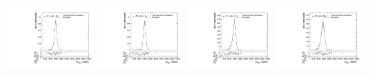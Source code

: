 \begin{figure}[htpb]
  \centering
  \includegraphics[width=0.2\textwidth]{fig/2Dfit/templateVsReco_VBFRadToWW2000_r0_MVV_mu_HP_nobb_LDy_linear.pdf}
  \includegraphics[width=0.2\textwidth]{fig/2Dfit/templateVsReco_VBFRadToWW2000_r0_MVV_mu_LP_nobb_LDy_linear.pdf}
  \includegraphics[width=0.2\textwidth]{fig/2Dfit/templateVsReco_VBFRadToWW2000_r0_MVV_mu_HP_nobb_HDy_linear.pdf}
  \includegraphics[width=0.2\textwidth]{fig/2Dfit/templateVsReco_VBFRadToWW2000_r0_MVV_mu_LP_nobb_HDy_linear.pdf}\\

\end{figure}

